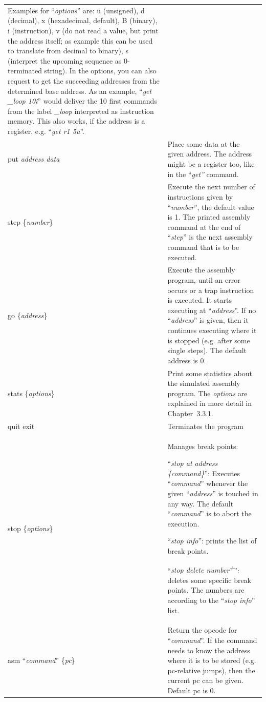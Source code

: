 \documentclass[
]{article}
\begin{document}
\begin{longtable}[]{@{}ll@{}}
\begin{minipage}[t]{0.47\columnwidth}
Examples for ``\emph{options}'' are: u (unsigned), d (decimal), x
(hexadecimal, default), B (binary), i (instruction), v (do not read a
value, but print the address itself; as example this can be used to
translate from decimal to binary), s (interpret the upcoming sequence as
0-terminated string). In the options, you can also request to get the
succeeding addresses from the determined base address. As an example,
``\emph{get \_loop 10i}'' would deliver the 10 first commands from the
label \emph{\_loop} interpreted as instruction memory. This also works,
if the address is a register, e.g. ``\emph{get r1 5u}''.\strut
\end{minipage}\tabularnewline
put \emph{address data} & Place some data at the given address. The
address might be a register too, like in the ``\emph{get''}
command.\tabularnewline
step \{\emph{number}\} & Execute the next number of instructions given
by ``\emph{number}'', the default value is 1. The printed assembly
command at the end of ``\emph{step}'' is the next assembly command that
is to be executed.\tabularnewline
go \{\emph{address}\} & Execute the assembly program, until an error
occurs or a trap instruction is executed. It starts executing at
``\emph{address}''. If no ``\emph{address}'' is given, then it continues
executing where it is stopped (e.g. after some single steps). The
default address is 0.\tabularnewline
stats \{\emph{options}\} & Print some statistics about the simulated
assembly program. The \emph{options} are explained in more detail in
Chapter~3.3.1.\tabularnewline
quit exit & Terminates the program\tabularnewline
\begin{minipage}[t]{0.47\columnwidth}\raggedright
stop \{\emph{options}\}\strut
\end{minipage} & \begin{minipage}[t]{0.47\columnwidth}\raggedright
Manages break points:

``\emph{stop at address \{command\}}'': Executes ``\emph{command}''
whenever the given ``\emph{address}'' is touched in any way. The default
``\emph{command}'' is to abort the execution.

``\emph{stop info}'': prints the list of break points.

``\emph{stop delete number\textsuperscript{+}}'': deletes some specific
break points. The numbers are according to the ``\emph{stop info}''
list.\strut
\end{minipage}\tabularnewline
asm ``\emph{command}'' \{\emph{pc}\} & Return the opcode for
``\emph{command}''. If the command needs to know the address where it is
to be stored (e.g. pc-relative jumps), then the current pc can be given.
Default pc is 0.\tabularnewline
\bottomrule
\end{longtable}
\end{document}
